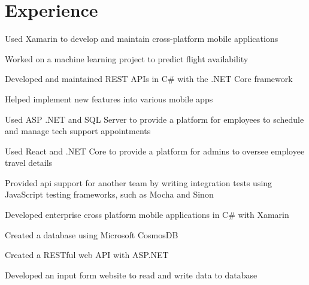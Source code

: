 \documentclass[]{deedy-resume-openfont}
\begin{document}
\hfill
\begin{minipage}[t]{0.60\textwidth} 


\section{Experience}

\vspace{\topsep}
\begin{tightemize}
\item Used Xamarin to develop and maintain cross-platform mobile applications
\item Worked on a machine learning project to predict flight availability
\item Developed and maintained REST APIs in C\# with the .NET Core framework
\item Helped implement new features into various mobile apps
\item Used ASP .NET and SQL Server to provide a platform for employees to schedule and manage tech support appointments
\item Used React and .NET Core to provide a platform for admins to oversee employee travel details
\item Provided api support for another team by writing integration tests using JavaScript testing frameworks, such as Mocha and Sinon
\end{tightemize}
\sectionsep


\begin{tightemize}
\item Developed enterprise cross platform mobile applications in C\# with Xamarin
\item Created a database using Microsoft CosmosDB
\item Created a RESTful web API with ASP.NET
\item Developed an input form website to read and write data to database
\end{tightemize}
\sectionsep

\end{minipage} 

\hrulefill
\end{document}
